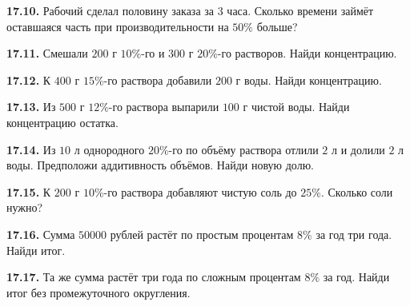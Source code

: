 \noindent\begin{minipage}[t]{\linewidth}\textbf{17.10.} Рабочий сделал половину заказа за \(3\) часа. Сколько времени займёт оставшаяся часть при производительности на \(50\%\) больше?\par\end{minipage}\par
\noindent\begin{minipage}[t]{\linewidth}\textbf{17.11.} Смешали \(200\) г \(10\%\)-го и \(300\) г \(20\%\)-го растворов. Найди концентрацию.\par\end{minipage}\par
\noindent\begin{minipage}[t]{\linewidth}\textbf{17.12.} К \(400\) г \(15\%\)-го раствора добавили \(200\) г воды. Найди концентрацию.\par\end{minipage}\par
\noindent\begin{minipage}[t]{\linewidth}\textbf{17.13.} Из \(500\) г \(12\%\)-го раствора выпарили \(100\) г чистой воды. Найди концентрацию остатка.\par\end{minipage}\par
\noindent\begin{minipage}[t]{\linewidth}\textbf{17.14.} Из \(10\) л однородного \(20\%\)-го по объёму раствора отлили \(2\) л и долили \(2\) л воды. Предположи аддитивность объёмов. Найди новую долю.\par\end{minipage}\par
\noindent\begin{minipage}[t]{\linewidth}\textbf{17.15.} К \(200\) г \(10\%\)-го раствора добавляют чистую соль до \(25\%\). Сколько соли нужно?\par\end{minipage}\par
\noindent\begin{minipage}[t]{\linewidth}\textbf{17.16.} Сумма \(50000\) рублей растёт по простым процентам \(8\%\) за год три года. Найди итог.\par\end{minipage}\par
\noindent\begin{minipage}[t]{\linewidth}\textbf{17.17.} Та же сумма растёт три года по сложным процентам \(8\%\) за год. Найди итог без промежуточного округления.\par\end{minipage}\par
